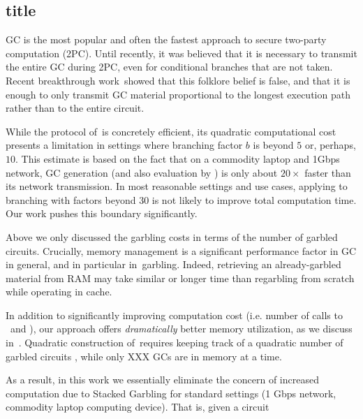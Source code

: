 \subsection{title}

GC is the most popular and often the fastest approach to secure two-party computation
(2PC).  Until recently, it was believed that it is necessary
to transmit the entire GC during 2PC, even for conditional branches that
are not taken.  Recent breakthrough work~\HK showed that this folklore belief is false, and that  it is enough to only transmit GC material  proportional to the
longest execution path rather than to the entire circuit.

While the protocol of~\HK is concretely efficient, its quadratic computational cost presents a  limitation in settings where branching factor $b$ is beyond $5$ or, perhaps, $10$.  This estimate is based on the fact that on a commodity laptop and 1Gbps network, GC generation (and also evaluation by \E) is only about $20\times$ faster than its network transmission.  In most reasonable  settings and use cases, applying \HK to branching with factors beyond $30$ is not likely to improve total computation time.  Our work pushes this boundary significantly.

Above we only discussed the garbling costs in terms of the number of garbled circuits.  Crucially, memory management is a significant performance factor in GC in general, and in particular in~\HK garbling.  Indeed, retrieving an already-garbled material from RAM may take similar or longer time than regarbling from scratch while operating in cache.

In addition to significantly improving computation cost (i.e. number of calls to \Gb\ and \Ev), our approach offers {\em dramatically} better memory utilization, as we discuss in~.  Quadratic construction of~\HK requires keeping track of a quadratic number of garbled circuits , while only XXX GCs are in memory at a time.  

As a result, in this work we essentially eliminate the concern of increased computation due to Stacked Garbling for standard settings (1 Gbps network, commodity laptop computing device).   That is, given a circuit



